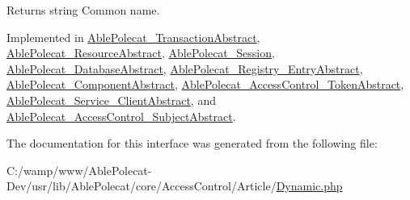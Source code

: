 \begin{DoxyReturn}{Returns}
string Common name. 
\end{DoxyReturn}


Implemented in \hyperlink{class_able_polecat___transaction_abstract_a3d0963e68bb313b163a73f2803c64600}{Able\+Polecat\+\_\+\+Transaction\+Abstract}, \hyperlink{class_able_polecat___resource_abstract_a3d0963e68bb313b163a73f2803c64600}{Able\+Polecat\+\_\+\+Resource\+Abstract}, \hyperlink{class_able_polecat___session_a3d0963e68bb313b163a73f2803c64600}{Able\+Polecat\+\_\+\+Session}, \hyperlink{class_able_polecat___database_abstract_a3d0963e68bb313b163a73f2803c64600}{Able\+Polecat\+\_\+\+Database\+Abstract}, \hyperlink{class_able_polecat___registry___entry_abstract_a3d0963e68bb313b163a73f2803c64600}{Able\+Polecat\+\_\+\+Registry\+\_\+\+Entry\+Abstract}, \hyperlink{class_able_polecat___component_abstract_a3d0963e68bb313b163a73f2803c64600}{Able\+Polecat\+\_\+\+Component\+Abstract}, \hyperlink{class_able_polecat___access_control___token_abstract_a3d0963e68bb313b163a73f2803c64600}{Able\+Polecat\+\_\+\+Access\+Control\+\_\+\+Token\+Abstract}, \hyperlink{class_able_polecat___service___client_abstract_a3d0963e68bb313b163a73f2803c64600}{Able\+Polecat\+\_\+\+Service\+\_\+\+Client\+Abstract}, and \hyperlink{class_able_polecat___access_control___subject_abstract_a3d0963e68bb313b163a73f2803c64600}{Able\+Polecat\+\_\+\+Access\+Control\+\_\+\+Subject\+Abstract}.



The documentation for this interface was generated from the following file\+:\begin{DoxyCompactItemize}
\item 
C\+:/wamp/www/\+Able\+Polecat-\/\+Dev/usr/lib/\+Able\+Polecat/core/\+Access\+Control/\+Article/\hyperlink{_dynamic_8php}{Dynamic.\+php}\end{DoxyCompactItemize}
